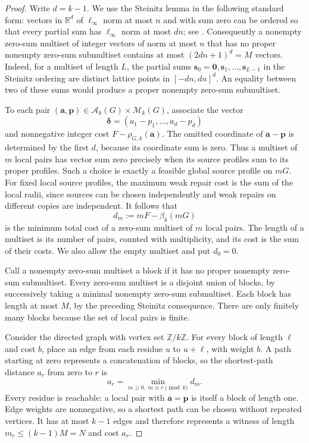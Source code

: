 \documentclass[10pt,a4paper]{amsart}
\numberwithin{equation}{section}
\theoremstyle{definition}
\theoremstyle{remark}
\begin{document}
\begin{proof}
Write $d=k-1$. We use the Steinitz lemma in the following standard
form: vectors in $\mathbb R^d$ of $\ell_\infty$ norm at most $n$
and with sum zero can be ordered so that every partial sum has
$\ell_\infty$ norm at most $dn$; see \cite{eisenbrandweismantel2018}.
Consequently a nonempty zero-sum multiset of integer vectors of norm
at most $n$ that has no proper nonempty zero-sum submultiset contains
at most $(2dn+1)^d=M$ vectors. Indeed, for a multiset of length $L$,
the partial sums $\mathbf s_0=\mathbf0,\mathbf s_1,\ldots,\mathbf s_{L-1}$
in the Steinitz ordering
are distinct lattice points in $[-dn,dn]^d$.
An equality between two of these sums would produce
a proper nonempty zero-sum submultiset.

To each pair
$(\mathbf a,\mathbf p)\in\mathcal A_k(G)\times\mathcal M_k(G)$,
associate the vector
\[
 \boldsymbol\delta=(a_1-p_1,\ldots,a_d-p_d)
\]
and nonnegative integer cost $F-\rho_{G,k}(\mathbf a)$.
The omitted coordinate of $\mathbf a-\mathbf p$ is determined by
the first $d$, because its coordinate sum is zero.
Thus a multiset of $m$ local pairs has vector sum zero precisely
when its source profiles sum to its proper profiles. Such a choice
is exactly a feasible global source profile on $mG$.
For fixed local source profiles, the maximum weak repair cost is
the sum of the local radii, since sources can be chosen independently
and weak repairs on different copies are independent. It follows that
\[
 d_m:=mF-\beta_k(mG)
\]
is the minimum total cost of a zero-sum multiset of $m$ local pairs.
The length of a multiset is its number of pairs, counted with
multiplicity, and its cost is the sum of their costs.
We also allow the empty multiset and put $d_0=0$.

Call a nonempty zero-sum multiset a block if it has no proper
nonempty zero-sum submultiset. Every zero-sum multiset is a disjoint
union of blocks, by successively taking a minimal nonempty zero-sum
submultiset. Each block has length at most $M$, by the preceding
Steinitz consequence. There are only finitely many blocks because
the set of local pairs is finite.

Consider the directed graph with vertex set $\mathbb Z/k\mathbb Z$.
For every block of length $\ell$ and cost $b$, place an edge from
each residue $u$ to $u+\ell$, with weight $b$.
A path starting at zero represents a concatenation of blocks, so
the shortest-path distance $a_r$ from zero to $r$ is
\[
 a_r=\min_{m\ge0,\ m\equiv r\pmod k}d_m.
\]
Every residue is reachable: a local pair with $\mathbf a=\mathbf p$
is itself a block of length one. Edge weights are nonnegative, so
a shortest path can be chosen without repeated vertices. It has
at most $k-1$ edges and therefore represents a witness of length
$m_r\le(k-1)M=N$ and cost $a_r$.


\end{proof}
\end{document}
